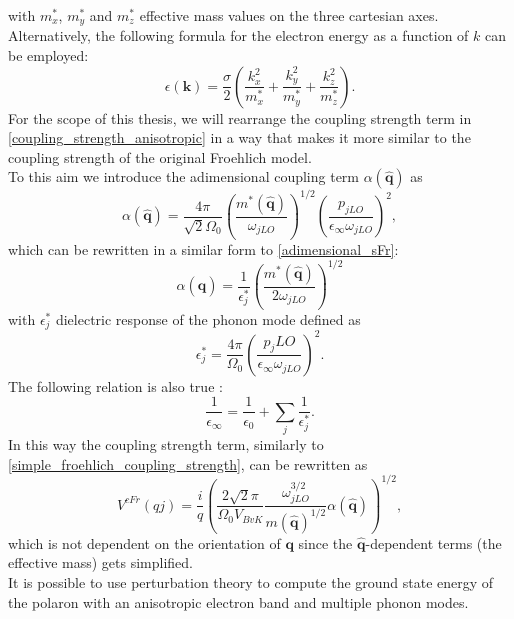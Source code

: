 with $m^*_x$, $m^*_y$ and $m^*_z$ effective mass values on the three cartesian axes.\\
Alternatively, the following formula for the electron energy as a function of $k$ can be employed:
\begin{equation}
    \epsilon(\mathbf{k})=\frac{\sigma}{2}\left(\frac{k^2_x}{m^*_x}+\frac{k_y^2}{m^*_y}+\frac{k_z^2}{m^*_z}\right).
    \label{anisotropic_electron_band_mass}
\end{equation}
For the scope of this thesis, we will rearrange the coupling strength term in \ref{coupling_strength_anisotropic} in a way that makes it more similar to 
the coupling strength of the original Froehlich model.\\
To this aim we introduce the adimensional coupling term $\alpha(\hat{\mathbf{q}})$ as \cite{de2023high} 
\begin{equation}
    \alpha(\hat{\mathbf{q}})=\frac{4\pi}{\sqrt{2}\Omega_0}\left(\frac{m^*(\hat{\mathbf{q}})}{\omega_{jLO}}\right)^{1/2}\left(\frac{p_{jLO}}{\epsilon_\infty\omega_{jLO}}\right)^{2},
    \label{coupling_alpha_anisotropic}
\end{equation}
which can be rewritten in a similar form to \ref{adimensional_sFr}:
\begin{equation}
    \alpha(\hat{\mathbf{q}})=\frac{1}{\epsilon_j^*}\left(\frac{m^*(\hat{\mathbf{q}})}{2\omega_{jLO}}\right)^{1/2}
\end{equation}
with $\epsilon^*_j$ dielectric response of the phonon mode defined as 
\begin{equation}
    \epsilon^*_j=\frac{4\pi}{\Omega_0}\left(\frac{p_j{LO}}{\epsilon_\infty\omega_{jLO}}\right)^2.
\end{equation}
The following relation is also true \cite{guster2021frohlich}:
\begin{equation}
    \frac{1}{\epsilon_\infty}=\frac{1}{\epsilon_0}+\sum_j\frac{1}{\epsilon^*_j}.
\end{equation}
In this way the coupling strength term, similarly to \ref{simple_froehlich_coupling_strength}, can be rewritten as
\begin{equation}
    V^{cFr}(qj)=\frac{i}{q}\left(\frac{2\sqrt{2}\pi}{\Omega_0V_{BvK}}\frac{\omega_{jLO}^{3/2}}{m(\hat{\mathbf{q}})^{1/2}}\alpha(\hat{\mathbf{q}})\right)^{1/2},
\end{equation}
which is not dependent on the orientation of $\mathbf{q}$ since the $\hat{\mathbf{q}}$-dependent terms (the effective mass) gets simplified.\\
It is possible to use perturbation theory to compute the ground state energy of the polaron with an anisotropic electron band and multiple phonon modes.  
